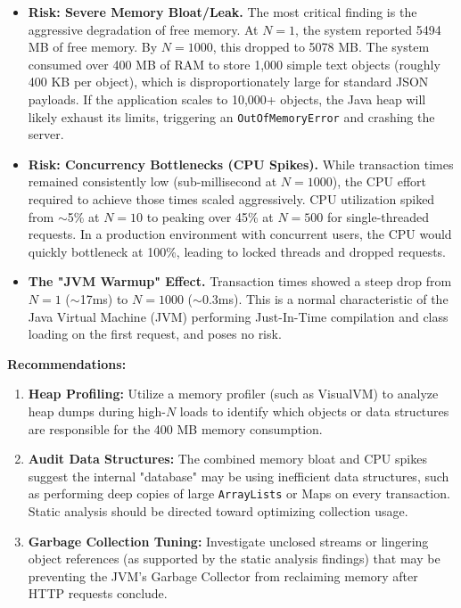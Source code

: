 \documentclass[11pt,a4paper]{article}
\begin{document}
\begin{itemize}
    \item \textbf{Risk: Severe Memory Bloat/Leak.} The most critical finding is the aggressive degradation of free memory. At $N=1$, the system reported 5494 MB of free memory. By $N=1000$, this dropped to 5078 MB. The system consumed over 400 MB of RAM to store 1,000 simple text objects (roughly 400 KB per object), which is disproportionately large for standard JSON payloads. If the application scales to 10,000+ objects, the Java heap will likely exhaust its limits, triggering an \texttt{OutOfMemoryError} and crashing the server.
    \item \textbf{Risk: Concurrency Bottlenecks (CPU Spikes).} While transaction times remained consistently low (sub-millisecond at $N=1000$), the CPU effort required to achieve those times scaled aggressively. CPU utilization spiked from $\sim$5\% at $N=10$ to peaking over 45\% at $N=500$ for single-threaded requests. In a production environment with concurrent users, the CPU would quickly bottleneck at 100\%, leading to locked threads and dropped requests.
    \item \textbf{The "JVM Warmup" Effect.} Transaction times showed a steep drop from $N=1$ ($\sim$17ms) to $N=1000$ ($\sim$0.3ms). This is a normal characteristic of the Java Virtual Machine (JVM) performing Just-In-Time compilation and class loading on the first request, and poses no risk.
\end{itemize}

\textbf{Recommendations:}
\begin{enumerate}
    \item \textbf{Heap Profiling:} Utilize a memory profiler (such as VisualVM) to analyze heap dumps during high-$N$ loads to identify which objects or data structures are responsible for the 400 MB memory consumption.
    \item \textbf{Audit Data Structures:} The combined memory bloat and CPU spikes suggest the internal "database" may be using inefficient data structures, such as performing deep copies of large \texttt{ArrayLists} or Maps on every transaction. Static analysis should be directed toward optimizing collection usage.
    \item \textbf{Garbage Collection Tuning:} Investigate unclosed streams or lingering object references (as supported by the static analysis findings) that may be preventing the JVM's Garbage Collector from reclaiming memory after HTTP requests conclude.
\end{enumerate}
\end{document}
